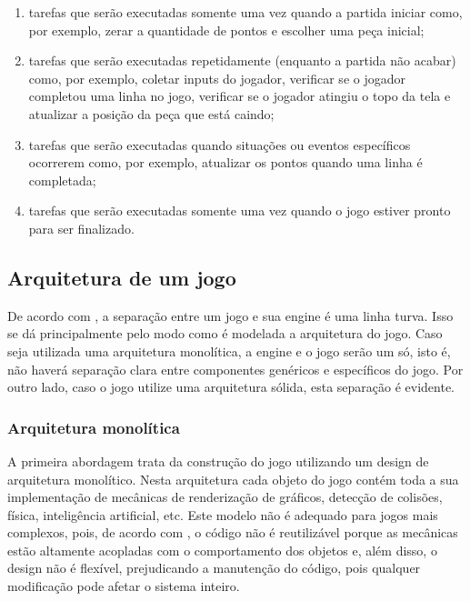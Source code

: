 \begin{enumerate}
\item tarefas que serão executadas somente uma vez quando a partida iniciar como, por exemplo, zerar a quantidade de pontos e escolher uma peça inicial;
\item tarefas que serão executadas repetidamente (enquanto a partida não acabar) como, por exemplo, coletar inputs do jogador, verificar se o jogador completou uma linha no jogo, verificar se o jogador atingiu o topo da tela e atualizar a posição da peça que está caindo;
\item tarefas que serão executadas quando situações ou eventos específicos ocorrerem como, por exemplo, atualizar os pontos quando uma linha é completada;
\item tarefas que serão executadas somente uma vez quando o jogo estiver pronto para ser finalizado.
\end{enumerate}

\subsection{Arquitetura de um jogo}

De acordo com , a separação entre um jogo e sua engine é uma linha turva. Isso se dá principalmente pelo modo como é modelada a arquitetura do jogo. Caso seja utilizada uma arquitetura monolítica, a engine e o jogo serão um só, isto é, não haverá separação clara entre componentes genéricos e específicos do jogo. Por outro lado, caso o jogo utilize uma arquitetura sólida, esta separação é evidente.

\subsubsection{Arquitetura monolítica}

A primeira abordagem trata da construção do jogo utilizando um design de arquitetura monolítico. Nesta arquitetura cada objeto do jogo contém toda a sua implementação de mecânicas de renderização de gráficos, detecção de colisões, física, inteligência artificial, etc. Este modelo não é adequado para jogos mais complexos, pois, de acordo com , o código não é reutilizável porque as mecânicas estão altamente acopladas com o comportamento dos objetos e, além disso, o design não é flexível, prejudicando a manutenção do código, pois qualquer modificação pode afetar o sistema inteiro.

